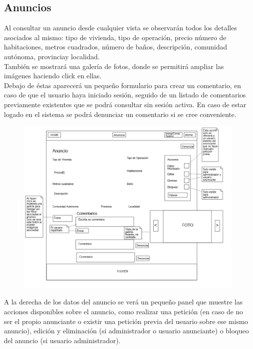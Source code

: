 \pagebreak

\subsection{Anuncios}

Al consultar un anuncio desde cualquier vista se observar\'{a}n todos los detalles asociados al mismo: 
tipo de vivienda, tipo de operaci\'{o}n, precio n\'{u}mero de habitaciones, metros cuadrados, n\'{u}mero de ba\~{n}os, descripci\'{o}n, comunidad aut\'{o}noma, provinciay localidad.\\

Tambi\'{e}n se mostrar\'{a} una galer\'{i}a de fotos, donde se permitir\'{a} ampliar las im\'{a}genes haciendo click en ellas.\\

Debajo de \'{e}stas aparecer\'{a} un peque\~{n}o formulario para crear un comentario, en caso de que el usuario haya iniciado sesi\'{o}n, seguido de un listado de comentarios previamente existentes que se podr\'{a} consultar sin sesi\'{o}n activa. En caso de estar logado en el sistema se podr\'{a} denunciar un comentario si se cree conveniente.\\

\begin{figure}[h!]
\centering
\includegraphics[width=1\textwidth]{Img/VisionAplicacion/vision_6.jpg}
\end{figure}

A la derecha de los datos del anuncio se ver\'{a} un peque\~{n}o panel que muestre las acciones disponibles sobre el anuncio, como realizar una petici\'{o}n (en caso de no ser el propio anunciante o existir una petici\'{o}n previa del usuario sobre ese mismo anuncio), edici\'{o}n y eliminaci\'{o}n (si administrador o usuario anunciante) o bloqueo del anuncio (si usuario administrador). \\

